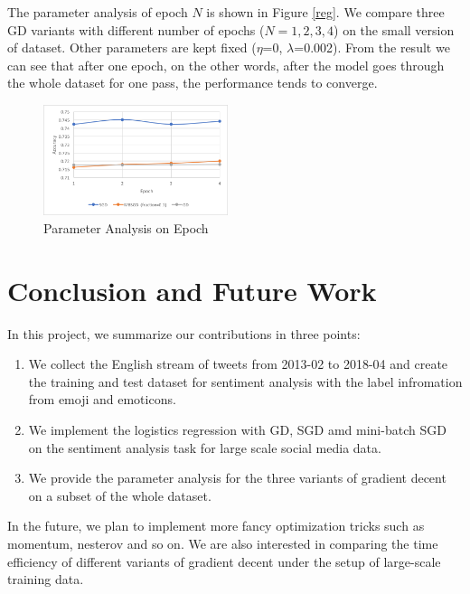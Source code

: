 \documentclass[sigconf]{acmart}
\begin{document}
The parameter analysis of epoch $N$ is shown in Figure \ref{reg}. We compare three GD variants with different number of epochs ($N = 1, 2, 3, 4$) on the small version of dataset. Other parameters are kept fixed ($\eta$=0, $\lambda$=0.002). From the result we can see that after one epoch, on the other words, after the model goes through the whole dataset for one pass, the performance tends to converge.

\begin{figure}[ht]
\centering
\includegraphics[width=0.48\textwidth]{epoch.png}
\caption{Parameter Analysis on Epoch}
\label{epoch}
\end{figure}

\section{Conclusion and Future Work}
\label{sec:conclusionAndFutureWork}

In this project, we summarize our contributions in three points:

\begin{enumerate}  
\item We collect the English stream of tweets from 2013-02 to 2018-04 and create the training and test dataset for sentiment analysis with the label infromation from emoji and emoticons.
\item We implement the logistics regression with GD, SGD amd mini-batch SGD on the sentiment analysis task for large scale social media data.
\item We provide the parameter analysis for the three variants of gradient decent on a subset of the whole dataset.
\end{enumerate}
In the future, we plan to implement more fancy optimization tricks such as momentum, nesterov and so on. We are also interested in comparing the time efficiency of different variants of gradient decent under the setup of large-scale training data.

\normalsize

{\vskip 12pt}
\noindent




\end{document}
